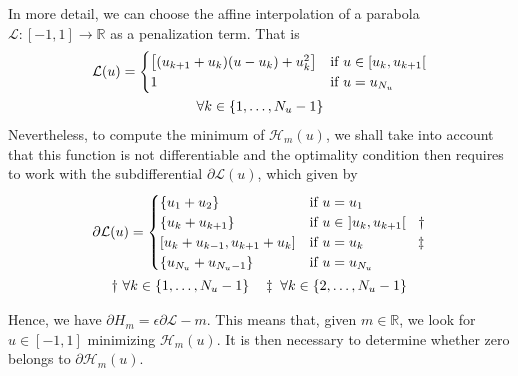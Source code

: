 In more detail, we can choose the affine interpolation of a parabola $\mathcal{L}:[-1,1] \rightarrow \mathbb{R}$ as a penalization term. That is
\begin{gather}\label{PLP}
    {\mathcal{L}(u)} = \begin{cases}
        \big[ (u_{k+1}+u_{k}) (u-u_k) + u_k^2 \big] & \text{if}  u \in [u_k,u_{k+1}[ \\
        1 & \text{if} \ u = u_{N_u} 
    \end{cases} \\
    \notag \forall k \in \{1,\dots,N_u-1\}
\end{gather}
%
Nevertheless, to compute the minimum of $\mathcal{H}_m(u)$, we shall take into account that this function is not differentiable and the optimality condition then requires to work with the subdifferential $\partial\mathcal{L}(u)$, which given by
\begin{gather}
        \partial\mathcal{L}(u)= \begin{cases}
            \{u_1 + u_2  \}   & \text{if} \ u = u_1 \\
            \{u_k + u_{k+1}\}  & \text{if} \ u \in \ ]u_k,u_{k+1}[ \hspace{0.9em} \dagger\\
            [u_k+u_{k-1} ,  u_{k+1}+u_k] & \text{if} \ u = u_k \hspace{3.9em} \ddagger \\
            \{u_{N_u} + u_{N_u-1}  \} & \text{if} \ u = u_{N_u} 
       \end{cases} \\
       \notag \dagger \ \forall k \in \{1,\dots,N_u-1\} \hspace{1em}
       \notag \ddagger  \ \forall k \in \{2,\dots,N_u-1\}
\end{gather} 

Hence, we have $\partial H_m = \epsilon\partial \mathcal{L} - m$. This means that, given $m\in \mathbb{R}$, we look for $u \in [-1,1]$ minimizing $\mathcal{H}_m(u)$. It is then necessary to determine whether zero belongs to $\partial \mathcal{H}_m(u)$.

